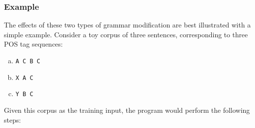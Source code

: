\documentclass[paper=a4, fontsize=11pt]{scrartcl} %
\numberwithin{equation}{section} %
\numberwithin{figure}{section} %
\numberwithin{table}{section} %
\begin{document}
\subsubsection{Example}

The effects of these two types of grammar modification are best illustrated with a simple example. Consider a toy corpus of three sentences, corresponding to three POS tag sequences:

\begin{enumerate}[(a)]
\item \texttt{A C B C}
\item \texttt{X A C}
\item \texttt{Y B C}
\end{enumerate}

Given this corpus as the training input, the program would perform the following steps:
\end{document}
